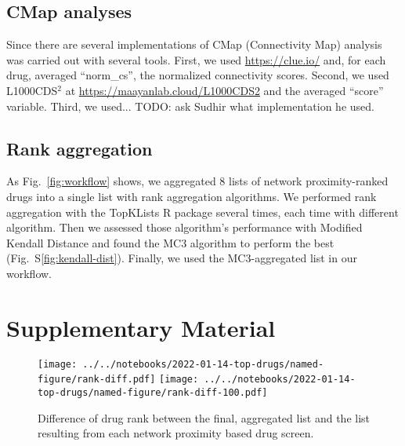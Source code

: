 \documentclass[letterpaper]{article}
\begin{document}
\subsection{CMap analyses}

Since there are several implementations of CMap (Connectivity Map) analysis was carried out with several tools.  First, we used
\url{https://clue.io/} \citep{Lamb2006} and, for each drug, averaged
``norm\_cs'',
the normalized connectivity scores.  Second, we used L1000CDS$^2$ at
\url{https://maayanlab.cloud/L1000CDS2} and the averaged ``score'' variable.
Third, we used... TODO: ask Sudhir what implementation he used.

\subsection{Rank aggregation}

As Fig.~\ref{fig:workflow} shows, we aggregated 8 lists of network
proximity-ranked drugs into a single list with rank aggregation algorithms.
We performed rank aggregation with the TopKLists R package
several times, each time with different algorithm.  Then we assessed those
algorithm's performance with Modified Kendall Distance and found the MC3
algorithm to perform the best (Fig.~S\ref{fig:kendall-dist}).  Finally, we
used the MC3-aggregated list in our workflow.



\newpage
\section*{Supplementary Material}

\setcounter{table}{0}
\makeatletter 
\renewcommand{\figurename}{Supplementary Table} %
\makeatother

\setcounter{figure}{0}
\makeatletter 
\renewcommand{\figurename}{Supplementary Figure} %
\makeatother

\begin{figure}[p]
\texttt{[image: ../../notebooks/2022-01-14-top-drugs/named-figure/rank-diff.pdf]}
\texttt{[image: ../../notebooks/2022-01-14-top-drugs/named-figure/rank-diff-100.pdf]}
\caption{
Difference of drug rank between the final, aggregated list and the list
resulting from each network proximity based drug screen.
}
\label{fig:rank-diff}
\end{figure}

\end{document}
